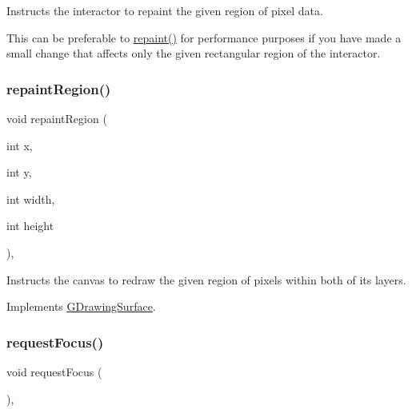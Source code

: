 Instructs the interactor to repaint the given region of pixel data. 

This can be preferable to \mbox{\hyperlink{classGCanvas_afb8dbc55702230f0030e47d6c009697f}{repaint()}} for performance purposes if you have made a small change that affects only the given rectangular region of the interactor. \mbox{\label{classGCanvas_a63af8fca5bf186367132ecf6af6f5eea}} 
\subsubsection{\texorpdfstring{repaint\+Region()}{repaintRegion()}\hspace{0.1cm}{\footnotesize\ttfamily [2/2]}}
{\footnotesize\ttfamily void repaint\+Region (\begin{DoxyParamCaption}\item[{int}]{x,  }\item[{int}]{y,  }\item[{int}]{width,  }\item[{int}]{height }\end{DoxyParamCaption})\hspace{0.3cm}{\ttfamily [override]}, {\ttfamily [virtual]}}



Instructs the canvas to redraw the given region of pixels within both of its layers. 



Implements \mbox{\hyperlink{classGDrawingSurface_a1a3898317080fecf8af21bbeaeeb37c3}{G\+Drawing\+Surface}}.

\mbox{\label{classGInteractor_a519fb2ac767f8b2febbb50b898b8c8cb}} 
\subsubsection{\texorpdfstring{request\+Focus()}{requestFocus()}}
{\footnotesize\ttfamily void request\+Focus (\begin{DoxyParamCaption}{ }\end{DoxyParamCaption})\hspace{0.3cm}{\ttfamily [virtual]}, {\ttfamily [inherited]}}



